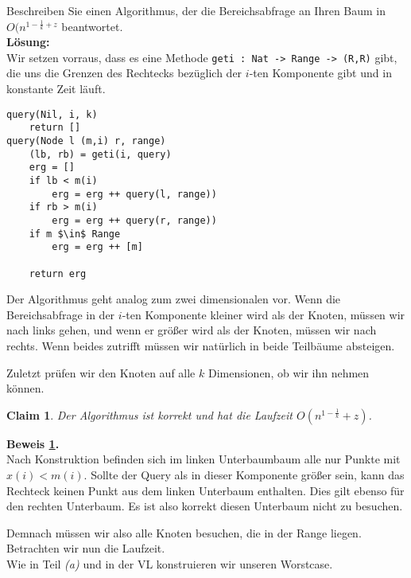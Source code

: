\documentclass[11pt,a4paper,ngerman]{article}
\newtheorem{lemma}{\bfseries Claim}
\begin{document}
Beschreiben Sie einen Algorithmus, der die Bereichsabfrage an Ihren Baum in $O(n^{1-\frac{1}{k} + z}$ beantwortet.\\

\textbf{Lösung:}\\

Wir setzen vorraus, dass es eine Methode \lstinline|geti : Nat -> Range -> (R,R)| gibt,
die uns die Grenzen des Rechtecks bezüglich der $i$-ten Komponente gibt und in konstante Zeit läuft.

\begin{lstlisting}
query(Nil, i, k)
    return []
query(Node l (m,i) r, range)
    (lb, rb) = geti(i, query)
    erg = []
    if lb < m(i)
        erg = erg ++ query(l, range))
    if rb > m(i)
        erg = erg ++ query(r, range))
    if m $\in$ Range
        erg = erg ++ [m]

    return erg
\end{lstlisting}

Der Algorithmus geht analog zum zwei dimensionalen vor. Wenn die Bereichsabfrage in der $i$-ten Komponente kleiner wird als
der Knoten, müssen wir nach links gehen, und wenn er größer wird als der Knoten, müssen wir nach rechts.
Wenn beides zutrifft müssen wir natürlich in beide Teilbäume absteigen.

Zuletzt prüfen wir den Knoten auf alle $k$ Dimensionen, ob wir ihn nehmen können.\\

\begin{lemma}\label{alge:ueb10:kdquery}
    Der Algorithmus ist korrekt und hat die Laufzeit $O(n^{1-\frac{1}{k}} + z)$.
\end{lemma}

\textbf{Beweis \ref{alge:ueb10:kdquery}.}\\
    Nach Konstruktion befinden sich im linken Unterbaumbaum alle nur Punkte mit $x(i) < m(i)$. Sollte der
    Query als in dieser Komponente größer sein, kann das Rechteck keinen Punkt aus dem linken Unterbaum enthalten.
    Dies gilt ebenso für den rechten Unterbaum. Es ist also korrekt diesen Unterbaum nicht zu besuchen.

    Demnach müssen wir also alle Knoten besuchen, die in der Range liegen.\\

    Betrachten wir nun die Laufzeit.\\

    Wie in Teil \emph{(a)} und in der VL konstruieren wir unseren Worstcase.
    
\end{document}
